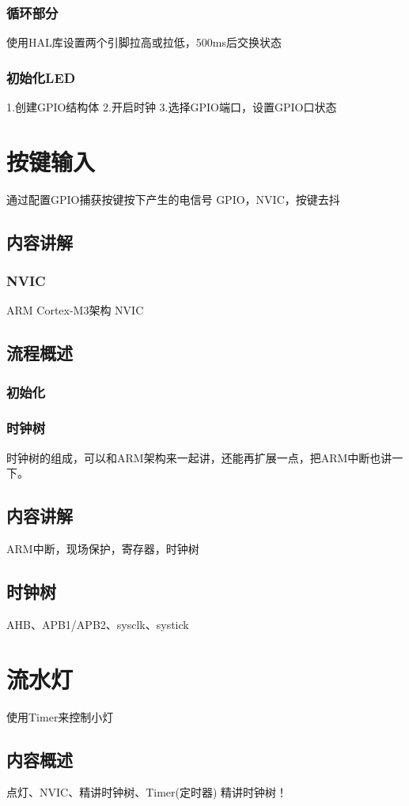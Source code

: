 \documentclass[UTF8]{ctexart}
\begin{document}
\subsubsection{循环部分}
使用HAL库设置两个引脚拉高或拉低，500ms后交换状态
\subsubsection{初始化LED}
1.创建GPIO结构体
2.开启时钟
3.选择GPIO端口，设置GPIO口状态



\section{按键输入}
通过配置GPIO捕获按键按下产生的电信号
GPIO，NVIC，按键去抖
\subsection{内容讲解}
\subsubsection{NVIC}
ARM Cortex-M3架构 NVIC
\subsection{流程概述}
\subsubsection{初始化}



\subsubsection{时钟树}
时钟树的组成，可以和ARM架构来一起讲，还能再扩展一点，把ARM中断也讲一下。
\subsection{内容讲解}
ARM中断，现场保护，寄存器，时钟树
\subsection{时钟树}
AHB、APB1/APB2、sysclk、systick



\section{流水灯}
使用Timer来控制小灯
\subsection{内容概述}
点灯、NVIC、精讲时钟树、Timer(定时器)
精讲时钟树！
\end{document}
